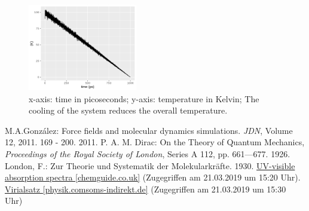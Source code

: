 \documentclass[10pt, a4paper, oneside, twocolumn]{article}
\begin{document}
\begin{figure}[t]
    \centering
    \includegraphics[width=180px]{plots//freezing/freezing_temp.png}
    \caption{x-axis: time in picoseconds; y-axis: temperature in Kelvin; The cooling of the system reduces the overall temperature.}
    \label{freezing_temp}
\end{figure}


\begin{thebibliography}{100}
 M.A.González: Force fields and molecular dynamics simulations. \textit{JDN}, Volume 12, 2011. 169 - 200. 2011.
 P. A. M. Dirac: On the Theory of Quantum Mechanics, \textit{Proceedings of the Royal Society of London}, Series A 112, pp. 661—677. 1926.
 London, F.: Zur Theorie und Systematik der Molekularkräfte. 1930. 
  \hyperlink{http://www.chemguide.co.uk/analysis/uvvisible/theory.html}{UV-visible absorption spectra [chemguide.co.uk]} (Zugegriffen am 21.03.2019 um 15:20 Uhr).
 \hyperlink{https://physik.cosmos-indirekt.de/Physik-Schule/Virialsatz}{Virialsatz [physik.comsoms-indirekt.de]} (Zugegriffen am 21.03.2019 um 15:30 Uhr)
\end{thebibliography}
\end{document}

